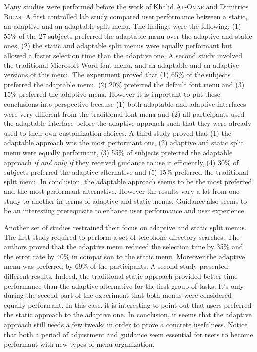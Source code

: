 \begin{figure}[!ht]
    
    \label{fig:adapt_organizations}
\end{figure}

Many studies were performed before the work of Khalid \textsc{Al-Omar} and 
Dimitrios 
\textsc{Rigas}. A first controlled lab study compared user performance between a 
static, 
an adaptive and an adaptable split menu. The 
findings were the following: (1) 55\% of the 27 subjects preferred the 
adaptable menu over the adaptive and static ones, (2) the static and adaptable 
split menus were equally performant but allowed a faster selection time than 
the 
adaptive one. A second study involved the traditional Microsoft Word font menu, 
and an adaptable and an adaptive versions of this menu. The experiment proved 
that (1) 65\% of the subjects preferred the adaptable menu, (2) 20\% preferred 
the default font menu and (3) 15\% preferred the adaptive menu. However it is 
important to put these conclusions into perspective because (1) both adaptable 
and adaptive interfaces were very different from the traditional font menu and 
(2) all participants used the adaptable interface before the adaptive approach 
such that they were already used to their own customization choices. A third 
study proved that (1) the adaptable approach was the most performant one, (2) 
adaptive and static split menu were equally performant, (3) 55\% of subjects 
preferred the adaptable approach \textit{if and only if} they received guidance 
to use it efficiently, (4) 30\% of subjects preferred the adaptive alternative 
and (5) 15\% preferred the traditional split menu. In conclusion, the adaptable 
approach seems to be the most preferred and the most performant alternative. 
However the results vary a lot from one study to another in terms of adaptive 
and static menus. Guidance also seems to be an interesting prerequisite to 
enhance user performance and user experience.\newline

Another set of studies restrained their focus on adaptive and static split 
menus. The first study required to perform a set of telephone directory 
searches. The authors proved that the adaptive menu reduced the selection time 
by 35\% and the error rate by 40\% in comparison to the static menu. Moreover 
the adaptive menu was preferred by 69\% of the participants. A second study 
presented different results. Indeed, the traditional static approach provided 
better time performance than the adaptive alternative for the first group 
of tasks. It’s only during the second part of the experiment that both menus 
were considered equally performant. In this case, it is interesting to point 
out that users preferred the static approach to the adaptive one. In conclusion, 
it seems that the adaptive approach still needs a few tweaks in order to prove 
a concrete usefulness. Notice that both a period of adjustment and guidance 
seem essential for users to become performant with new types of menu 
organization.\newline

